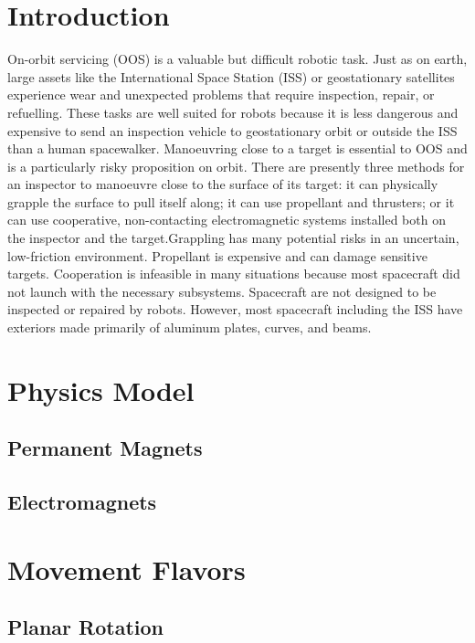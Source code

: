 \documentclass[10pt]{article}
\begin{document}
\section{Introduction}
On-orbit servicing (OOS) is a valuable but difficult robotic task. \cite{}  Just as on earth, large assets like the International Space Station (ISS) or geostationary satellites experience wear and unexpected problems that require inspection, repair, or refuelling.  These tasks are well suited for robots because it is less dangerous and expensive to send an inspection vehicle to geostationary orbit or outside the ISS than a human spacewalker.  
%
Manoeuvring close to a target is essential to OOS and is a particularly risky proposition on orbit. There are presently three methods for an inspector to manoeuvre close to the surface of its target: it can physically grapple the surface to pull itself along; it can use propellant and thrusters; or it can use cooperative, non-contacting electromagnetic systems installed both on the inspector and the target.Grappling has many potential risks in an uncertain, low-friction environment. Propellant is expensive and can damage sensitive targets. Cooperation is infeasible in many situations because most spacecraft did not launch with the necessary subsystems. Spacecraft are not designed to be inspected or repaired by robots.
%
However, most spacecraft including the ISS have exteriors made primarily of aluminum plates, curves, and beams. 
\section{Physics Model}
\subsection{Permanent Magnets}
\subsection{Electromagnets}
\section{Movement Flavors}
\subsection{Planar Rotation}
\end{document}
